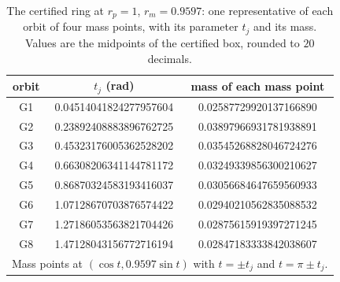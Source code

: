 \begin{table}[t]
\caption{The certified ring at $r_p=1$, $r_m=0.9597$: one representative of each orbit of four mass points, with its parameter $t_j$ and its mass. Values are the midpoints of the certified box, rounded to $20$ decimals.}\label{tab:ring}
\centering\footnotesize
\begin{tabular}{@{}ccc@{}}
\hline
orbit & $t_j$ (rad) & mass of each mass point \\
\hline
G1 & 0.04514041824277957604 & 0.02587729920137166890 \\
G2 & 0.23892408883896762725 & 0.03897966931781938891 \\
G3 & 0.45323176005362528202 & 0.03545268828046724276 \\
G4 & 0.66308206341144781172 & 0.03249339856300210627 \\
G5 & 0.86870324583193416037 & 0.03056684647659560933 \\
G6 & 1.07128670703876574422 & 0.02940210562835088532 \\
G7 & 1.27186053563821704426 & 0.02875615919397271245 \\
G8 & 1.47128043156772716194 & 0.02847183333842038607 \\
\hline
\multicolumn{3}{l}{Mass points at $(\cos t,0.9597\sin t)$ with $t=\pm t_j$ and $t=\pi\pm t_j$.}
\end{tabular}
\end{table}
